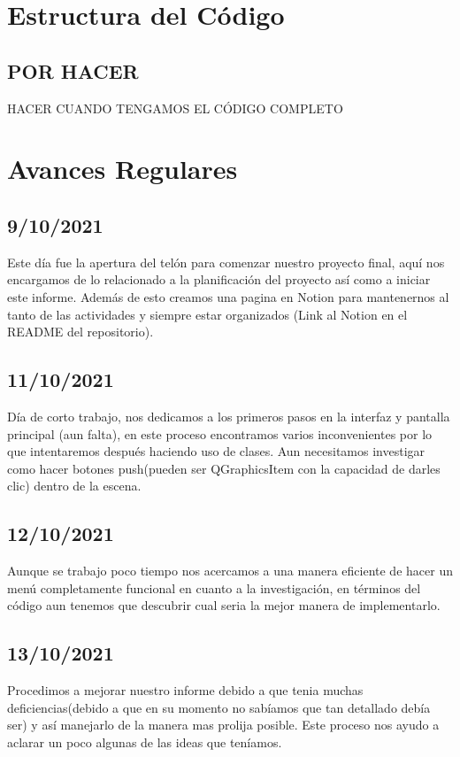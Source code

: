 \documentclass{article}
\begin{document}
\section{Estructura del Código}
    \subsection{POR HACER}
    HACER CUANDO TENGAMOS EL CÓDIGO COMPLETO
    
\section{Avances Regulares}
    \subsection{9/10/2021}
        Este día fue la apertura del telón para comenzar nuestro proyecto final, aquí nos encargamos de lo relacionado a la planificación del proyecto así como a iniciar este informe. Además de esto creamos una pagina en Notion para mantenernos al tanto de las actividades y siempre estar organizados (Link al Notion en el README del repositorio).
        
    \subsection{11/10/2021}
        Día de corto trabajo, nos dedicamos a los primeros pasos en la interfaz y pantalla principal (aun falta), en este proceso encontramos varios inconvenientes por lo que intentaremos después haciendo uso de clases. Aun necesitamos investigar como hacer botones push(pueden ser QGraphicsItem con la capacidad de darles clic) dentro de la escena.
        
    \subsection{12/10/2021}
        Aunque se trabajo poco tiempo nos acercamos a una manera eficiente de hacer un menú completamente funcional en cuanto a la investigación, en términos del código aun tenemos que descubrir cual seria la mejor manera de implementarlo.
        
    \subsection{13/10/2021}
        Procedimos a mejorar nuestro informe debido a que tenia muchas deficiencias(debido a que en su momento no sabíamos que tan detallado debía ser) y así manejarlo de la manera mas prolija posible. Este proceso nos ayudo a aclarar un poco algunas de las ideas que teníamos.
        
\end{document}
